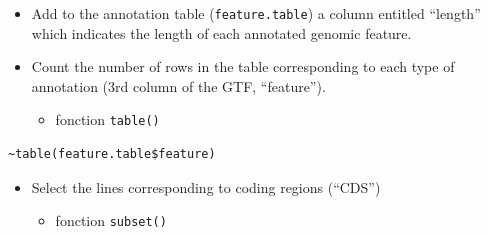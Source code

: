 \documentclass[]{article}
\newenvironment{Shaded}{\begin{snugshade}}{\end{snugshade}}
\newcommand{\KeywordTok}[1]{\textcolor[rgb]{0.94,0.87,0.69}{#1}}
\newcommand{\DecValTok}[1]{\textcolor[rgb]{0.86,0.86,0.80}{#1}}
\newcommand{\StringTok}[1]{\textcolor[rgb]{0.80,0.58,0.58}{#1}}
\newcommand{\OperatorTok}[1]{\textcolor[rgb]{0.94,0.94,0.82}{#1}}
\newcommand{\NormalTok}[1]{\textcolor[rgb]{0.80,0.80,0.80}{#1}}
\providecommand{\tightlist}{%
  \setlength{\itemsep}{0pt}\setlength{\parskip}{0pt}}
\begin{document}
\begin{itemize}
\tightlist
\item
  Add to the annotation table (\texttt{feature.table}) a column entitled
  ``length'' which indicates the length of each annotated genomic
  feature.
\end{itemize}

\begin{Shaded}
\end{Shaded}

\begin{itemize}
\item
  Count the number of rows in the table corresponding to each type of
  annotation (3rd column of the GTF, ``feature'').

  \begin{itemize}
  \tightlist
  \item
    fonction \texttt{table()}
  \end{itemize}
\end{itemize}

\begin{Shaded}
\end{Shaded}

\begin{verbatim}
~table(feature.table$feature)
\end{verbatim}

\begin{itemize}
\item
  Select the lines corresponding to coding regions (``CDS'')

  \begin{itemize}
  \tightlist
  \item
    fonction \texttt{subset()}
  \end{itemize}
\end{itemize}
\end{document}
